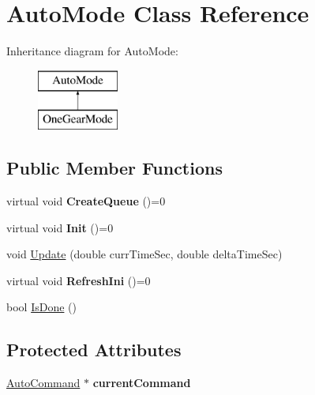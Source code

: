 \hypertarget{class_auto_mode}{}\section{Auto\+Mode Class Reference}
\label{class_auto_mode}
Inheritance diagram for Auto\+Mode\+:\begin{figure}[H]
\begin{center}
\leavevmode
\includegraphics[height=2.000000cm]{class_auto_mode}
\end{center}
\end{figure}
\subsection*{Public Member Functions}
\begin{DoxyCompactItemize}
\item 
\mbox{\label{class_auto_mode_a71d5383a52a2e1d29548099d86ae66b6}} 
virtual void {\bfseries Create\+Queue} ()=0
\item 
\mbox{\label{class_auto_mode_ae30ad1e90a36975db5b1bd6d0d764408}} 
virtual void {\bfseries Init} ()=0
\item 
void \hyperlink{class_auto_mode_af5eb2f835e2712588986ca8fd9a8735a}{Update} (double curr\+Time\+Sec, double delta\+Time\+Sec)
\item 
\mbox{\label{class_auto_mode_acb6a8d7e9e3635dd1d0af27297fe045f}} 
virtual void {\bfseries Refresh\+Ini} ()=0
\item 
bool \hyperlink{class_auto_mode_a6f734a1af959e284fced7666e397bf65}{Is\+Done} ()
\end{DoxyCompactItemize}
\subsection*{Protected Attributes}
\begin{DoxyCompactItemize}
\item 
\mbox{\label{class_auto_mode_acaf4e4b36bbc309c6fae4cdac56b38d3}} 
\hyperlink{class_auto_command}{Auto\+Command} $\ast$ {\bfseries current\+Command}
\end{DoxyCompactItemize}


